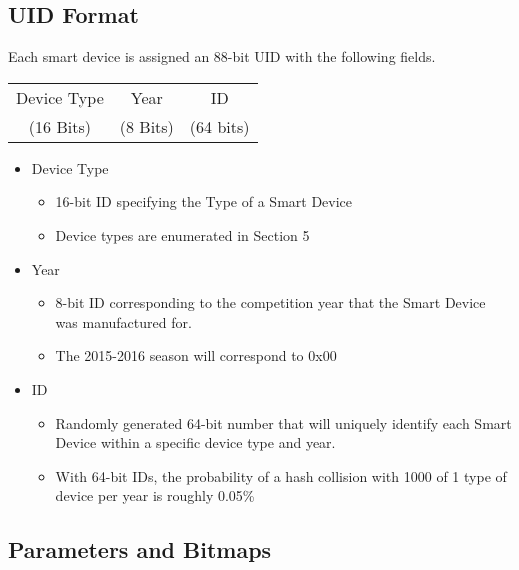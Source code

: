 \documentclass[12pt]{book}
\begin{document}
\subsection{UID Format}
Each smart device is assigned an 88-bit UID with the following fields.

\begin{center}
	\begin{tabular}{|c|c|c|}
	\hline
	Device Type & Year & ID \\
	(16 Bits) & (8 Bits) & (64 bits) \\
	\hline
	\end{tabular}
\end{center}

\begin{itemize}
	\item Device Type
	\begin{itemize}
		\item 16-bit ID specifying the Type of a Smart Device
		\item Device types are enumerated in Section 5
	\end{itemize}
	\item Year
	\begin{itemize}
		\item 8-bit ID corresponding to the competition year that the Smart Device was manufactured for.
		\item The 2015-2016 season will correspond to 0x00
	\end{itemize}
	\item ID
  	\begin{itemize}
  		\item Randomly generated 64-bit number that will uniquely identify each Smart Device within a specific device type and year.
  		\item With 64-bit IDs, the probability of a hash collision with 1000 of 1 type of device per year is roughly 0.05\%
	\end{itemize}
\end{itemize}

\subsection{Parameters and Bitmaps}
\end{document}
